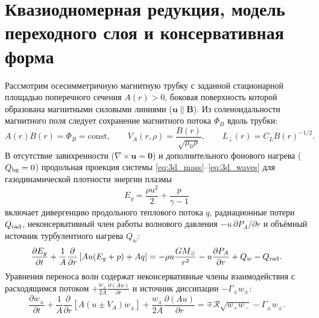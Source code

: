 \documentclass[11pt,a4paper]{article}
\begin{document}
\section{Квазиодномерная редукция, модель переходного слоя и консервативная форма}

Рассмотрим осесимметричную магнитную трубку с заданной стационарной площадью поперечного сечения $A(r) > 0$, боковая поверхность которой образована магнитными силовыми линиями ($\bm{u} \parallel \bm{B}$). Из соленоидальности магнитного поля следует сохранение магнитного потока $\Phi_B$ вдоль трубки:
\begin{equation}
A(r)B(r) = \Phi_B = \mathrm{const}, \qquad V_A(r,\rho) = \frac{B(r)}{\sqrt{\mu_0\rho}}, \qquad L_\perp(r) = C_L B(r)^{-1/2}.
\label{eq:flux_tube}
\end{equation}
В отсутствие завихренности ($\nabla\times\bm{u}=\bm{0}$) и дополнительного фонового нагрева ($Q_{\rm bg}=0$) продольная проекция системы \eqref{eq:3d_mass}--\eqref{eq:3d_waves} для газодинамической плотности энергии плазмы
\begin{equation}
E_g = \frac{\rho u^2}{2} + \frac{p}{\gamma-1}
\label{eq:gas_energy_def}
\end{equation}
включает дивергенцию продольного теплового потока $q$, радиационные потери $Q_{\rm rad}$, неконсервативный член работы волнового давления $-u\,\partial P_A/\partial r$ и объёмный источник турбулентного нагрева $Q_w$:
\begin{equation}
\frac{\partial E_g}{\partial t} + \frac{1}{A}\frac{\partial}{\partial r}\left[A u (E_g + p) + A q\right] = -\rho u \frac{GM_\odot}{r^2} - u\frac{\partial P_A}{\partial r} + Q_w - Q_{\rm rad}.
\label{eq:noncons_Eg}
\end{equation}
Уравнения переноса волн содержат неконсервативные члены взаимодействия с расходящимся потоком $+\frac{w_\pm}{2A}\frac{\partial(Au)}{\partial r}$ и источник диссипации $-\Gamma_\pm w_\pm$:
\begin{equation}
\frac{\partial w_\pm}{\partial t} + \frac{1}{A}\frac{\partial}{\partial r}\left[A(u \pm V_A)w_\pm\right] + \frac{w_\pm}{2A}\frac{\partial(Au)}{\partial r} = \mp\mathcal{R}\sqrt{w_+ w_-} - \Gamma_\pm w_\pm.
\label{eq:noncons_w}
\end{equation}
\end{document}
